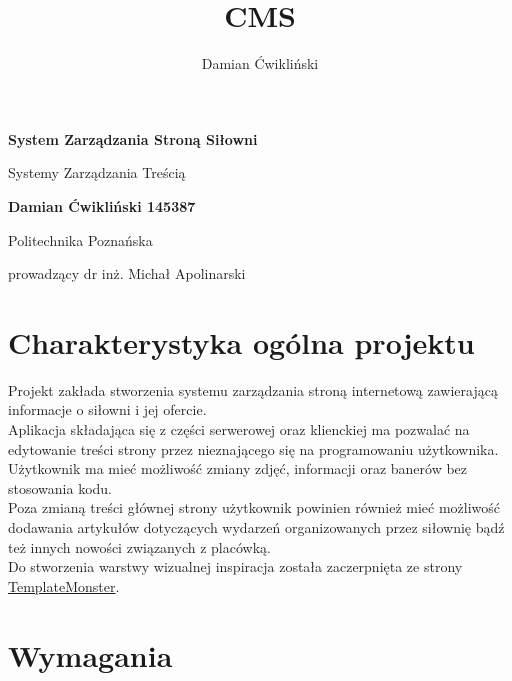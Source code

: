 \documentclass[12pt]{article}
\title{CMS}
\author{Damian Ćwikliński}
\begin{document}
\begin{titlepage}
    \begin{center}
        \vspace*{4cm}
            
        \Huge
        \textbf{System Zarządzania Stroną Siłowni}
            
        \vspace{0.5cm}
        \LARGE
        Systemy Zarządzania Treścią
            
        \vspace{1.5cm}
            
        \textbf{Damian Ćwikliński 145387}
            
        \vfill
            
        Politechnika Poznańska
            
        \vspace{0.8cm}
           
            
        prowadzący dr inż. Michał Apolinarski
            
    \end{center}
\end{titlepage}

\tableofcontents

\newpage
\section{Charakterystyka ogólna projektu}
Projekt zakłada stworzenia systemu zarządzania stroną internetową zawierającą informacje o siłowni i jej ofercie. 
\\

Aplikacja składająca się z części serwerowej oraz klienckiej ma pozwalać na edytowanie treści strony przez nieznającego się na programowaniu użytkownika. Użytkownik ma mieć możliwość zmiany zdjęć, informacji oraz banerów bez stosowania kodu.
\\

Poza zmianą treści głównej strony użytkownik powinien również mieć możliwość dodawania artykułów dotyczących wydarzeń organizowanych przez siłownię bądź też innych nowości związanych z placówką.
\\

Do stworzenia warstwy wizualnej inspiracja została zaczerpnięta ze strony \href{https://demo.templatemonster.com/demo/51682.html}{TemplateMonster}.

\newpage
\section{Wymagania}
\end{document}
